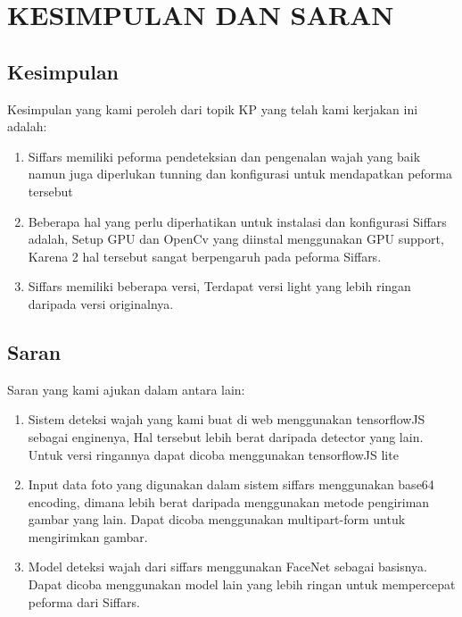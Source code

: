 \chapter{KESIMPULAN DAN SARAN}


\section{Kesimpulan}

Kesimpulan yang kami peroleh dari topik KP yang telah kami kerjakan ini adalah:

\begin{enumerate}[nolistsep]

  \item Siffars memiliki peforma pendeteksian dan pengenalan wajah yang baik namun juga diperlukan tunning dan konfigurasi untuk mendapatkan peforma tersebut

  \item Beberapa hal yang perlu diperhatikan untuk instalasi dan konfigurasi Siffars adalah, Setup GPU dan OpenCv yang diinstal menggunakan GPU support, Karena 2 hal tersebut sangat berpengaruh pada peforma Siffars.

  \item Siffars memiliki beberapa versi, Terdapat versi light yang lebih ringan daripada versi originalnya.

\end{enumerate}

\section{Saran}

Saran yang kami ajukan dalam \lipsum[30][1-2] antara lain:

\begin{enumerate}[nolistsep]

  \item Sistem deteksi wajah yang kami buat di web menggunakan tensorflowJS sebagai enginenya, Hal tersebut lebih berat daripada detector yang lain. Untuk versi ringannya dapat dicoba menggunakan tensorflowJS lite

  \item Input data foto yang digunakan dalam sistem siffars menggunakan base64 encoding, dimana lebih berat daripada menggunakan metode pengiriman gambar yang lain. Dapat dicoba menggunakan multipart-form untuk mengirimkan gambar.

  \item Model deteksi wajah dari siffars menggunakan FaceNet sebagai basisnya. Dapat dicoba menggunakan model lain yang lebih ringan untuk mempercepat peforma dari Siffars.

\end{enumerate}
